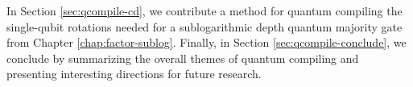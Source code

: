 In Section \ref{sec:qcompile-cd}, we contribute a method for
quantum compiling the single-qubit rotations needed for a
sublogarithmic depth quantum majority gate from Chapter \ref{chap:factor-sublog}.
Finally, in Section \ref{sec:qcompile-conclude}, we conclude by summarizing
the overall themes of quantum compiling and presenting interesting
directions for future research.









%







